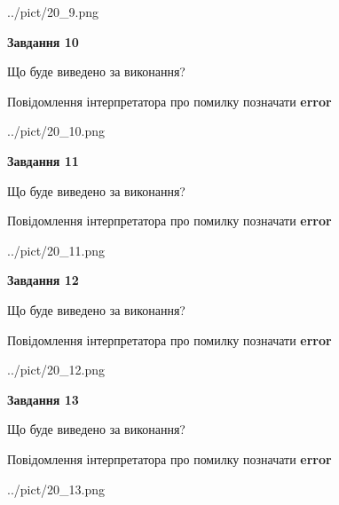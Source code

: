 \documentclass[11pt, ukrainian]{article}
\begin{document}
{\begin {large}
\begin{center}
	{../pict/20_9.png}
\end{center}
\newpage

{\begin {center}\textbf{Завдання 10}\end {center}}\par
Що буде виведено за виконання? \par
Повідомлення інтерпретатора про помилку позначати \textbf{error}

\begin{center}
	{../pict/20_10.png}
\end{center}
\newpage

{\begin {center}\textbf{Завдання 11}\end {center}}\par
Що буде виведено за виконання? \par
Повідомлення інтерпретатора про помилку позначати \textbf{error}

\begin{center}
	{../pict/20_11.png}
\end{center}
\newpage

{\begin {center}\textbf{Завдання 12}\end {center}}\par
Що буде виведено за виконання? \par
Повідомлення інтерпретатора про помилку позначати \textbf{error}

\begin{center}
	{../pict/20_12.png}
\end{center}
\newpage

{\begin {center}\textbf{Завдання 13}\end {center}}\par
Що буде виведено за виконання? \par
Повідомлення інтерпретатора про помилку позначати \textbf{error}

\begin{center}
	{../pict/20_13.png}
\end{center}
\newpage


\end{large}}
\end{document}
